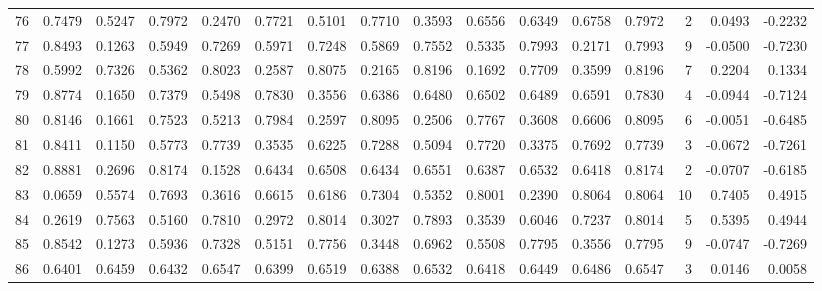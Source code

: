 \begin{tabular}{lrrrrrrrrrrrrrrr}
76  &      0.7479 &  0.5247 &  0.7972 &  0.2470 &  0.7721 &  0.5101 &  0.7710 &  0.3593 &  0.6556 &  0.6349 &   0.6758 &     0.7972 &      2 &                    0.0493 &                    -0.2232 \\
77  &      0.8493 &  0.1263 &  0.5949 &  0.7269 &  0.5971 &  0.7248 &  0.5869 &  0.7552 &  0.5335 &  0.7993 &   0.2171 &     0.7993 &      9 &                   -0.0500 &                    -0.7230 \\
78  &      0.5992 &  0.7326 &  0.5362 &  0.8023 &  0.2587 &  0.8075 &  0.2165 &  0.8196 &  0.1692 &  0.7709 &   0.3599 &     0.8196 &      7 &                    0.2204 &                     0.1334 \\
79  &      0.8774 &  0.1650 &  0.7379 &  0.5498 &  0.7830 &  0.3556 &  0.6386 &  0.6480 &  0.6502 &  0.6489 &   0.6591 &     0.7830 &      4 &                   -0.0944 &                    -0.7124 \\
80  &      0.8146 &  0.1661 &  0.7523 &  0.5213 &  0.7984 &  0.2597 &  0.8095 &  0.2506 &  0.7767 &  0.3608 &   0.6606 &     0.8095 &      6 &                   -0.0051 &                    -0.6485 \\
81  &      0.8411 &  0.1150 &  0.5773 &  0.7739 &  0.3535 &  0.6225 &  0.7288 &  0.5094 &  0.7720 &  0.3375 &   0.7692 &     0.7739 &      3 &                   -0.0672 &                    -0.7261 \\
82  &      0.8881 &  0.2696 &  0.8174 &  0.1528 &  0.6434 &  0.6508 &  0.6434 &  0.6551 &  0.6387 &  0.6532 &   0.6418 &     0.8174 &      2 &                   -0.0707 &                    -0.6185 \\
83  &      0.0659 &  0.5574 &  0.7693 &  0.3616 &  0.6615 &  0.6186 &  0.7304 &  0.5352 &  0.8001 &  0.2390 &   0.8064 &     0.8064 &     10 &                    0.7405 &                     0.4915 \\
84  &      0.2619 &  0.7563 &  0.5160 &  0.7810 &  0.2972 &  0.8014 &  0.3027 &  0.7893 &  0.3539 &  0.6046 &   0.7237 &     0.8014 &      5 &                    0.5395 &                     0.4944 \\
85  &      0.8542 &  0.1273 &  0.5936 &  0.7328 &  0.5151 &  0.7756 &  0.3448 &  0.6962 &  0.5508 &  0.7795 &   0.3556 &     0.7795 &      9 &                   -0.0747 &                    -0.7269 \\
86  &      0.6401 &  0.6459 &  0.6432 &  0.6547 &  0.6399 &  0.6519 &  0.6388 &  0.6532 &  0.6418 &  0.6449 &   0.6486 &     0.6547 &      3 &                    0.0146 &                     0.0058 \\

\end{tabular}
